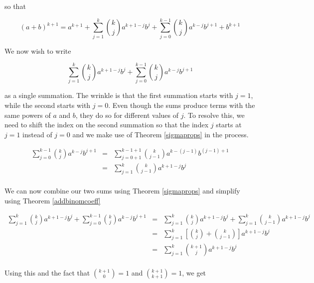 so that

\[ (a+b)^{k+1} = \displaystyle{a^{k+1} + \sum_{j=1}^{k} \binom{k}{j} a^{k+1-j} b^{j} + \sum_{j=0}^{k-1} \binom{k}{j} a^{k-j} b^{j+1}  + b^{k+1}}\]

We now wish to write

\[\displaystyle{\sum_{j=1}^{k} \binom{k}{j} a^{k+1-j} b^{j} + \sum_{j=0}^{k-1} \binom{k}{j} a^{k-j} b^{j+1}}\]

as a single summation.  The wrinkle is that the first summation starts with $j=1$, while the second starts with $j=0$. Even though the sums produce terms with the same powers of $a$ and $b$, they do so for different values of $j$.  To resolve this, we need to shift the index on the second summation so that the index $j$ starts at $j=1$ instead of $j=0$ and we make use of Theorem \ref{sigmaprops} in the process.

\[ \begin{array}{rcl}

\displaystyle{ \sum_{j=0}^{k-1} \binom{k}{j} a^{k-j} b^{j+1}} & = & \displaystyle{\sum_{j=0+1}^{k-1+1} \binom{k}{j-1} a^{k-(j-1)} b^{(j-1)+1}} \\[15pt]
                                                              & = & \displaystyle{\sum_{j=1}^{k} \binom{k}{j-1} a^{k+1-j} b^{j}} \\ [15pt] 
\end{array} \]

We can now combine our two sums using Theorem \ref{sigmaprops} and simplify using Theorem \ref{addbinomcoeff}

\[ \begin{array}{rcl}

\displaystyle{\sum_{j=1}^{k} \binom{k}{j} a^{k+1-j} b^{j} + \sum_{j=0}^{k-1} \binom{k}{j} a^{k-j} b^{j+1}} & = & \displaystyle{\sum_{j=1}^{k} \binom{k}{j} a^{k+1-j} b^{j} + \sum_{j=1}^{k} \binom{k}{j-1} a^{k+1-j} b^{j}} \\ [15pt] 

& = & \displaystyle{\sum_{j=1}^{k} \left[ \binom{k}{j} + \binom{k}{j-1} \right] a^{k+1-j} b^{j} } \\ [15pt]

& = & \displaystyle{\sum_{j=1}^{k} \binom{k+1}{j} a^{k+1-j} b^{j} } \\

\end{array} \]

Using this and the fact that $\binom{k+1}{0} = 1$ and $\binom{k+1}{k+1} = 1$, we get

